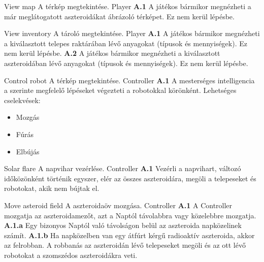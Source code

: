 \documentclass[../../projlab]{subfiles}
\begin{document}
\begin{use-case}
	{View map}
	{A térkép megtekintése.}
	{Player}
    \textbf{A.1} A játékos bármikor megnézheti a már meglátogatott aszteroidákat ábrázoló térképet. Ez nem kerül lépésbe.
\end{use-case}

\begin{use-case}
	{View inventory}
	{A tároló megtekintése.}
	{Player}
    \textbf{A.1} A játékos bármikor megnézheti a kiválasztott telepes raktárában lévő anyagokat (típusok és mennyiségek).  Ez nem kerül lépésbe.
	\newline
	\textbf{A.2} A játékos bármikor megnézheti a kiválasztott aszteroidában lévő anyagokat (típusok és mennyiségek).  Ez nem kerül lépésbe.
\end{use-case}

\begin{use-case}
	{Control robot}
	{A térkép megtekintése.}
	{Controller}
    \textbf{A.1} A mesterséges intelligencia a szerinte megfelelő lépéseket végezteti a robotokkal körönként.
	\newline
	Lehetséges cselekvések:
	\begin{itemize}
		\item Mozgás
		\item Fúrás
		\item Elbújás
	\end{itemize}
		
\end{use-case}

\begin{use-case}
	{Solar flare}
	{A napvihar vezérlése.}
	{Controller}
    \textbf{A.1} Vezérli a napvihart, változó időközönként történik egyszer, elér az összes aszteroidára, megöli a telepeseket és robotokat, akik nem bújtak el.
\end{use-case}

\begin{use-case}
	{Move asteroid field}
	{A aszteroidaöv mozgása.}
	{Controller}
    \textbf{A.1} A Controller mozgatja az aszteroidamezőt, azt a Naptól távolabbra vagy közelebbre mozgatja.
	\newline
	\textbf{A.1.a} Egy bizonyos Naptól való távolságon belül az aszteroida napközelinek számít.
	\newline
	\textbf{A.1.b} Ha napközelben van egy átfúrt kérgű radioaktív aszteroida, akkor az felrobban. A robbanás az aszteroidán lévő telepeseket megöli és az ott lévő robotokat a szomszédos aszteroidákra veti.
\end{use-case}
\end{document}
